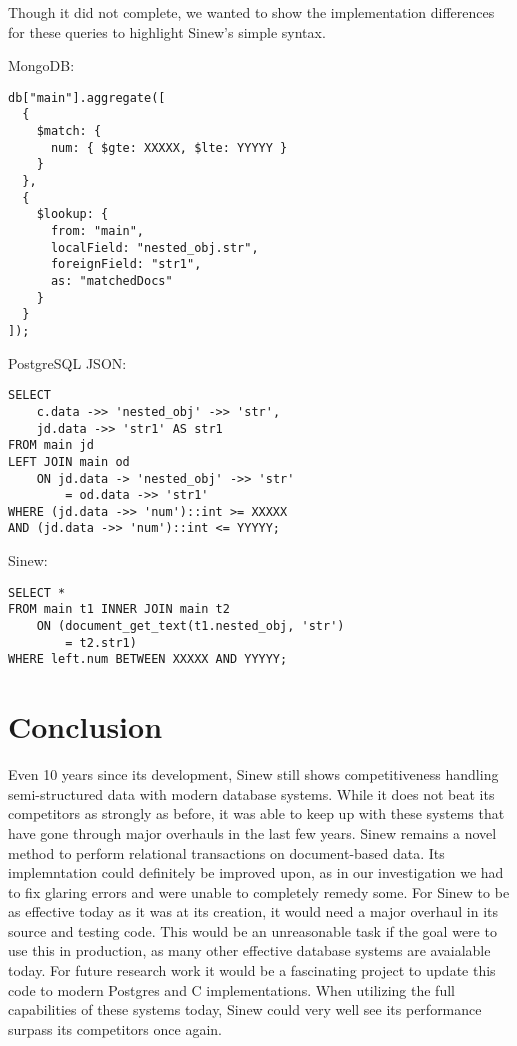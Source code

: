 \documentclass[sigconf]{acmart}
\begin{document}
Though it did not complete, we wanted to show the implementation differences for these queries to highlight Sinew's simple syntax.

\noindent
MongoDB:
\begin{tcolorbox}[colback=gray!10, colframe=gray!50, sharp corners, boxrule=0.1mm]
\begin{verbatim} 
db["main"].aggregate([
  {
    $match: {
      num: { $gte: XXXXX, $lte: YYYYY }
    }
  },
  {
    $lookup: {
      from: "main",
      localField: "nested_obj.str",
      foreignField: "str1",
      as: "matchedDocs"
    }
  }
]);
\end{verbatim}
\end{tcolorbox}

\noindent
PostgreSQL JSON:
\begin{tcolorbox}[colback=gray!10, colframe=gray!50, sharp corners, boxrule=0.1mm]
\begin{verbatim} 
SELECT 
    c.data ->> 'nested_obj' ->> 'str',
    jd.data ->> 'str1' AS str1
FROM main jd
LEFT JOIN main od
    ON jd.data -> 'nested_obj' ->> 'str' 
        = od.data ->> 'str1'
WHERE (jd.data ->> 'num')::int >= XXXXX
AND (jd.data ->> 'num')::int <= YYYYY;
\end{verbatim}
\end{tcolorbox}

\noindent
Sinew:
\begin{tcolorbox}[colback=gray!10, colframe=gray!50, sharp corners, boxrule=0.1mm]
\begin{verbatim} 
SELECT *
FROM main t1 INNER JOIN main t2
    ON (document_get_text(t1.nested_obj, 'str') 
        = t2.str1)
WHERE left.num BETWEEN XXXXX AND YYYYY;  
\end{verbatim}
\end{tcolorbox}

\section{Conclusion}
Even 10 years since its development, Sinew still shows competitiveness handling semi-structured data with modern database systems. While it does not beat its competitors as strongly as before, it was able to keep up with these systems that have gone through major overhauls in the last few years. Sinew remains a novel method to perform relational transactions on document-based data. Its implemntation could definitely be improved upon, as in our investigation we had to fix glaring errors and were unable to completely remedy some. For Sinew to be as effective today as it was at its creation, it would need a major overhaul in its source and testing code. This would be an unreasonable task if the goal were to use this in production, as many other effective database systems are avaialable today. For future research work it would be a fascinating project to update this code to modern Postgres and C implementations. When utilizing the full capabilities of these systems today, Sinew could very well see its performance surpass its competitors once again.



\end{document}

